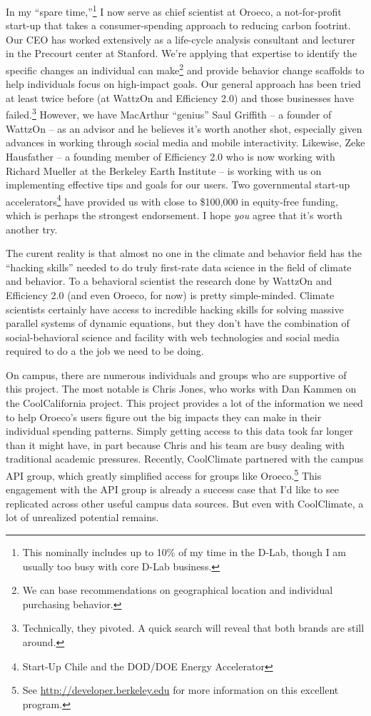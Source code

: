 In my “spare time,”\footnote{This nominally includes up to 10\% of my time in
    the D-Lab, though I am usually too busy with core D-Lab business.} I now
serve as chief scientist at Oroeco, a not-for-profit start-up that takes a
consumer-spending approach to reducing carbon footrint.  Our CEO has worked
extensively as a life-cycle analysis consultant and lecturer in the Precourt
center at Stanford. We're applying that expertise to identify the specific
changes an individual can make\footnote{We can base recommendations on
    geographical location and individual purchasing behavior.} and provide
behavior change scaffolds to help individuals focus on high-impact goals. Our
general approach has been tried at least twice before (at WattzOn and Efficiency
2.0) and those businesses have failed.\footnote{Technically, they pivoted. A
    quick search will reveal that both brands are still around.} However, we
have MacArthur “genius” Saul Griffith -- a founder of WattzOn -- as an advisor
and he believes it's worth another shot, especially given advances in working
through social media and mobile interactivity. Likewise, Zeke Hausfather -- a
founding member of Efficiency 2.0 who is now working with Richard Mueller at the
Berkeley Earth Institute -- is working with us on implementing effective tips
and goals for our users. Two governmental start-up
accelerators\footnote{Start-Up Chile and the DOD/DOE Energy Accelerator} have
provided us with close to \$100,000 in equity-free funding, which is perhaps the
strongest endorsement. I hope \emph{you} agree that it's worth another try.

The curent reality is that almost no one in the climate and behavior field has
the “hacking skills” needed to do truly first-rate data science in the field of
climate and behavior. To a behavioral scientist the research done by WattzOn and
Efficiency 2.0 (and even Oroeco, for now) is pretty simple-minded. Climate
scientists certainly have access to incredible hacking skills for solving
massive parallel systems of dynamic equations, but they don't have the
combination of social-behavioral science and facility with web technologies and
social media required to do a the job we need to be doing.

On campus, there are numerous individuals and groups who are supportive of this
project.  The most notable is Chris Jones, who works with Dan Kammen on the
CoolCalifornia project.  This project provides a lot of the information we need
to help Oroeco's users figure out the big impacts they can make in their
individual spending patterns.  Simply getting access to this data took far
longer than it might have, in part because Chris and his team are busy dealing
with traditional academic pressures. Recently, CoolClimate partnered with the
campus API group, which greatly simplified access for groups like
Oroeco.\footnote{See \url{http://developer.berkeley.edu} for more information on
    this excellent program.} This engagement with the API group is already a
success case that I'd like to see replicated across other useful campus data
sources. But even with CoolClimate, a lot of unrealized potential remains.

